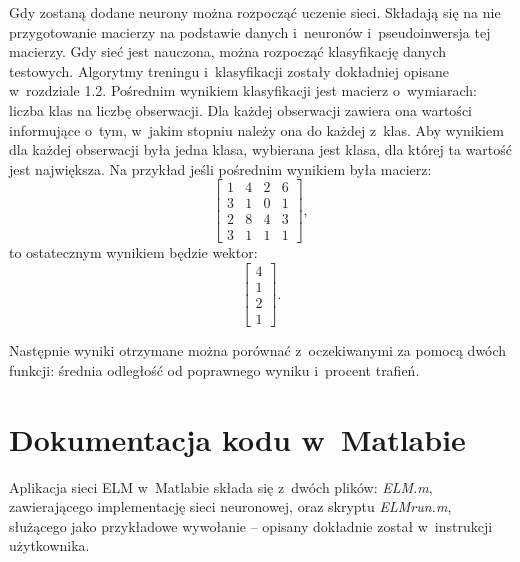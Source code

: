 \documentclass[pl]{minipw} %
\begin{document}
Gdy zostaną dodane neurony można rozpocząć uczenie sieci. 
Składają się na nie przygotowanie macierzy na podstawie danych i~neuronów i~pseudoinwersja tej macierzy. 
Gdy sieć jest nauczona, można rozpocząć klasyfikację danych testowych.
Algorytmy treningu i~klasyfikacji zostały dokładniej opisane w~rozdziale 1.2.
Pośrednim wynikiem klasyfikacji jest macierz o~wymiarach: liczba klas na liczbę obserwacji.
Dla każdej obserwacji zawiera ona wartości informujące o~tym, w~jakim stopniu należy ona do każdej z~klas.
Aby wynikiem dla każdej obserwacji była jedna klasa, wybierana jest klasa, dla której ta wartość jest największa.
Na przykład jeśli pośrednim wynikiem była macierz:
\[ \begin{bmatrix} 1&4&2&6 \\ 3&1&0&1 \\ 2&8&4&3 \\ 3&1&1&1 \end{bmatrix},\]
to ostatecznym wynikiem będzie wektor:
\[ \begin{bmatrix} 4 \\ 1 \\ 2 \\ 1 \end{bmatrix}.\]

Następnie wyniki otrzymane można porównać z~oczekiwanymi za pomocą dwóch funkcji: średnia odległość od poprawnego wyniku i~procent trafień.

\section{Dokumentacja kodu w~Matlabie}
Aplikacja sieci ELM w~Matlabie składa się z~dwóch plików: \textit{ELM.m}, zawierającego implementację sieci neuronowej, oraz skryptu \textit{ELM\textunderscore run.m}, służącego jako przykładowe wywołanie -- opisany dokładnie został w~instrukcji użytkownika.
\end{document}
